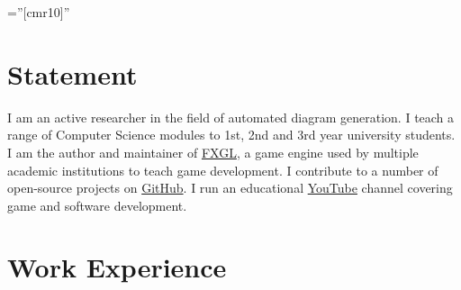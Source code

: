 \documentclass[a4paper,11pt]{article} %
\begin{document}
\pagestyle{empty} %

\font\fb=''[cmr10]'' %


\par{\bigskip\par} %

\section{Statement}

I am an active researcher in the field of automated diagram generation.
I teach a range of Computer Science modules to 1st, 2nd and 3rd year
university students.
I am the author and maintainer of \href{https://github.com/AlmasB/FXGL}{FXGL}, a game engine used by multiple
academic institutions to teach game development.
I contribute to a number of open-source projects on \href{https://github.com/AlmasB}{GitHub}.
I run an educational \href{https://www.youtube.com/almasb0/videos}{YouTube} channel covering
game and software development.


\section{Work Experience}
\end{document}
